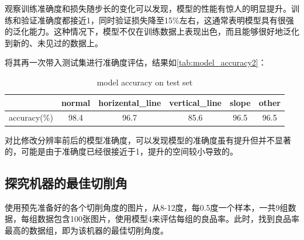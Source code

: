 观察训练准确度和损失随步长的变化可以发现，模型的性能有惊人的明显提升。训练和验证准确度都接近1，同时验证损失降至15\%左右，这通常表明模型具有很强的泛化能力。这种情况下，模型不仅在训练数据上表现出色，而且能够很好地泛化到新的、未见过的数据上。

将其再一次带入测试集进行准确度评估，结果如\autoref{tab:model_accuracy2}：

\begin{table}
    \centering
    \caption{model accuracy on test set}
    \begin{tabular}{cccccc}
        \toprule
        & normal & horizental\_line & vertical\_line & slope & other \\
        \midrule
        accuracy(\%) & 98.4 & 96.7 & 85.6 & 96.5 & 96.5 \\
        \bottomrule
    \end{tabular}
    \label{tab:model_accuracy2}
    \end{table}

对比修改分辨率前后的模型准确度，可以发现模型的准确度虽有提升但并不显著的，可能是由于准确度已经很接近于1，提升的空间较小导致的。


\subsection{探究机器的最佳切削角}

使用预先准备好的各个切削角度的图片，从8-12度，每0.5度一个样本，一共9组数据，每组数据包含100张图片，使用模型4来评估每组的良品率。此时，找到良品率最高的数据组，即为该机器的最佳切削角度。

